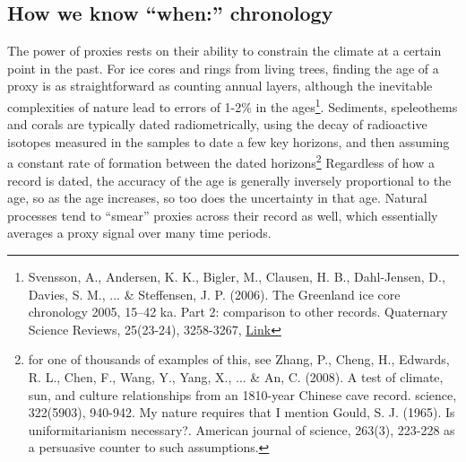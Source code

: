 \documentclass[amstex,12pt]{book}
\begin{document}
\subsection{How we know ``when:'' chronology}
The power of proxies rests on their ability to constrain the climate at a certain point in the past. For ice cores and rings from living trees, finding the age of a proxy is as straightforward as counting annual layers, although the inevitable complexities of nature lead to errors of 1-2\% in the ages\footnote{Svensson, A., Andersen, K. K., Bigler, M., Clausen, H. B., Dahl-Jensen, D., Davies, S. M., ... \& Steffensen, J. P. (2006). The Greenland ice core chronology 2005, 15–42 ka. Part 2: comparison to other records. Quaternary Science Reviews, 25(23-24), 3258-3267, \href{https://pdfs.semanticscholar.org/273c/c5454f8f3fef1e698bb3d1da55fff48ccc42.pdf}{Link}}. Sediments, speleothems and corals are typically dated radiometrically, using the decay of radioactive isotopes measured in the samples to date a few key horizons, and then assuming a constant rate of formation between the dated horizons\footnote{for one of thousands of examples of this, see Zhang, P., Cheng, H., Edwards, R. L., Chen, F., Wang, Y., Yang, X., ... \& An, C. (2008). A test of climate, sun, and culture relationships from an 1810-year Chinese cave record. science, 322(5903), 940-942. My nature requires that I mention Gould, S. J. (1965). Is uniformitarianism necessary?. American journal of science, 263(3), 223-228 as a persuasive counter to such assumptions.} Regardless of how a record is dated, the accuracy of the age is generally inversely proportional to the age, so as the age increases, so too does the uncertainty in that age. Natural processes tend to ``smear'' proxies across their record as well, which essentially averages a proxy signal over many time periods.\\     
\end{document}
